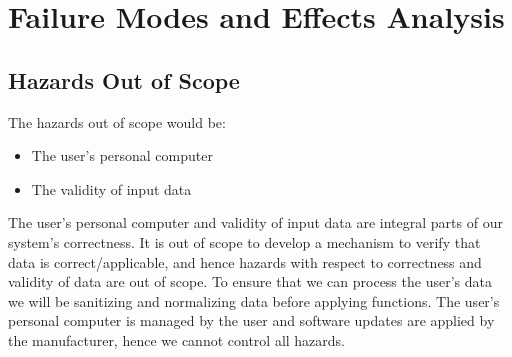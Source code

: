 \documentclass{article}
\begin{document}
\section{Failure Modes and Effects Analysis}
\subsection{Hazards Out of Scope}
The hazards out of scope would be:
\begin{itemize}
    \item The user's personal computer
    \item The validity of input data
\end{itemize}

\noindent The user's personal computer and validity of input data are integral parts of our system's correctness. It is out of scope to develop a mechanism to verify that data is correct/applicable, and hence hazards with respect to correctness and validity of data are out of scope. To ensure that we can process the user's data we will be sanitizing and normalizing data before applying functions. The user's personal computer is managed by the user and software updates are applied by the manufacturer, hence we cannot control all hazards. 
\end{document}
